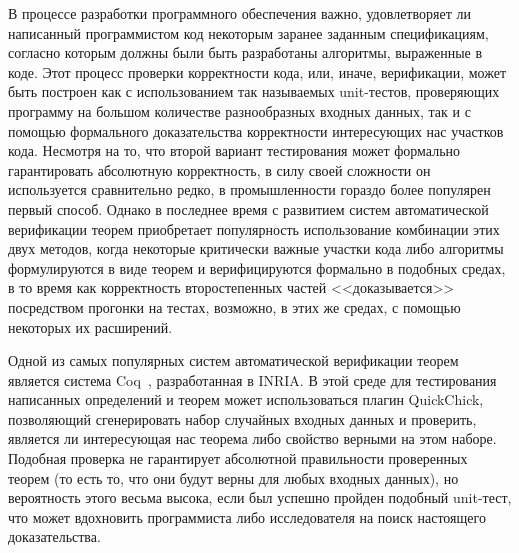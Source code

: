 



\usepackage{fancyvrb}
\usepackage{tikz}
\usepackage{float}
\usepackage{stmaryrd}
\usepackage{mathrsfs}
\usetikzlibrary{arrows}


\DeclareMathOperator{\bttr}{T\_tr}
\DeclareMathOperator{\btnil}{T\_nil}

\newcommand{\tbttr}{T\_tr}
\newcommand{\tcoq}{Coq}
\newcommand{\tqc}{QuickChick}

\newcommand{\brc}[1]{{\color{red}#1}}



\Intro

В процессе разработки программного обеспечения важно, удовлетворяет ли написанный программистом код некоторым заранее заданным спецификациям, согласно которым должны были быть разработаны алгоритмы, выраженные в коде. Этот процесс проверки корректности кода, или, иначе, верификации, может быть построен как с использованием так называемых unit-тестов, проверяющих программу на большом количестве разнообразных входных данных, так и с помощью формального доказательства корректности интересующих нас участков кода. Несмотря на то, что второй вариант тестирования может формально гарантировать абсолютную корректность, в силу своей сложности он используется сравнительно редко, в промышленности гораздо более популярен первый способ. Однако в последнее время с развитием систем автоматической верификации теорем приобретает популярность использование комбинации этих двух методов, когда некоторые критически важные участки кода либо алгоритмы формулируются в виде теорем и верифицируются формально в подобных средах, в то время как корректность второстепенных частей <<доказывается>> посредством прогонки на тестах, возможно, в этих же средах, с помощью некоторых их расширений.

Одной из самых популярных систем автоматической верификации теорем является система \tcoq~\autocite{CoqManual}, разработанная в INRIA. В этой среде для тестирования написанных определений и теорем может использоваться плагин \tqc, позволяющий сгенерировать набор случайных входных данных и проверить, является ли интересующая нас теорема либо свойство верными на этом наборе. Подобная проверка не гарантирует абсолютной правильности проверенных теорем (то есть то, что они будут верны для любых входных данных), но вероятность этого весьма высока, если был успешно пройден подобный unit-тест, что может вдохновить программиста либо исследователя на поиск настоящего доказательства.

